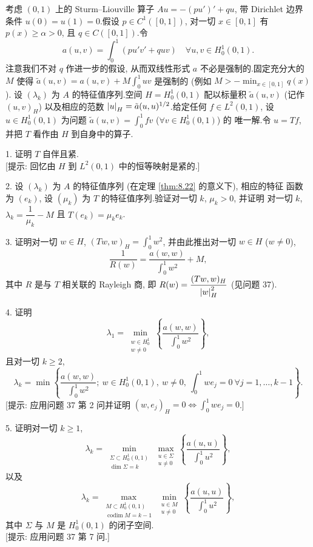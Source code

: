 \begin{problem}
\label{prob:49}
考虑 $(0,1)$ 上的 Sturm--Liouville 算子 $Au=-(pu')'+qu$, 带 Dirichlet 边界条件
$u(0)=u(1)=0$.假设 $p\in C^1([0,1])$, 对一切 $x\in[0,1]$ 有 $p(x)\ge\alpha>0$,
且 $q\in C([0,1])$.令
\begin{equation*}
a(u,v)=\int_0^1(pu'v'+quv)\quad\forall u,v\in H_0^1(0,1).
\end{equation*}
注意我们不对 $q$ 作进一步的假设, 从而双线性形式 $a$ 不必是强制的.固定充分大的 $M$
使得 $\tilde a(u,v)=a(u,v)+M\int_0^1uv$ 是强制的 (例如 $M>-\min_{x\in[0,1]}q(x)$).
设 $(\lambda_k)$ 为 $A$ 的特征值序列.空间 $H=H_0^1(0,1)$ 配以标量积 $\tilde a(u,v)$
(记作 $(u,v)_H$) 以及相应的范数 $\left|u\right|_H=\tilde a(u,u)^{1/2}$.给定任何 $f\in L^2(0,1)$,
设 $u\in H_0^1(0,1)$ 为问题 $\tilde a(u,v)=\int_0^1fv$ ($\forall v\in H_0^1(0,1)$) 的
唯一解.令 $u=Tf$, 并把 $T$ 看作由 $H$ 到自身中的算子.

1. 证明 $T$ 自伴且紧.\\
{[提示: 回忆由 $H$ 到 $L^2(0,1)$ 中的恒等映射是紧的.]}

2. 设 $(\lambda_k)$ 为 $A$ 的特征值序列 (在定理  \ref{thm:8.22} 的意义下), 相应的特征
函数为 $(e_k)$, 设 $(\mu_k)$ 为 $T$ 的特征值序列.验证对一切 $k$, $\mu_k>0$, 并证明
对一切 $k$, $\lambda_k=\dfrac{1}{\mu_k}-M$ 且 $T(e_k)=\mu_ke_k$.

3. 证明对一切 $w\in H$, $(Tw,w)_H=\int_0^1w^2$, 并由此推出对一切 $w\in H$ ($w\ne0$),
\begin{equation*}
\frac{1}{R(w)}=\frac{a(w,w)}{\int_0^1w^2}+M,
\end{equation*}
其中 $R$ 是与 $T$ 相关联的 Rayleigh 商, 即 $R(w)=\dfrac{(Tw,w)_H}{\left|w\right|_H^2}$
(见问题 37).

4. 证明
\begin{equation}
\lambda_1=\min_{\substack{w\in H_0^1\\w\ne0}}\left\{\frac{a(w,w)}{\int_0^1w^2}\right\},
\label{eq:prob49.1}
\end{equation}
且对一切 $k\ge2$,
\begin{equation*}
\lambda_k=\min\left\{\frac{a(w,w)}{\int_0^1w^2};\ w\in H_0^1(0,1),\ w\ne0,\ \int_0^1we_j=0\ \forall j=1,\dots,k-1\right\}.
\end{equation*}
[提示: 应用问题 37 第 2 问并证明 $(w,e_j)_H=0\iff\int_0^1we_j=0$.]

5. 证明对一切 $k\ge1$,
\begin{equation*}
\lambda_k=\min_{\substack{\Sigma\subset H_0^1(0,1)\\\dim\Sigma=k}}\max_{\substack{u\in\Sigma\\u\ne0}}\left\{\frac{a(u,u)}{\int_0^1u^2}\right\},
\end{equation*}
以及
\begin{equation*}
\lambda_k=\max_{\substack{M\subset H_0^1(0,1)\\\operatorname{codim}M=k-1}}\min_{\substack{u\in M\\u\ne0}}\left\{\frac{a(u,u)}{\int_0^1u^2}\right\},
\end{equation*}
其中 $\Sigma$ 与 $M$ 是 $H_0^1(0,1)$ 的闭子空间.\\
{[提示: 应用问题 37 第 7 问.]}


\end{problem}
